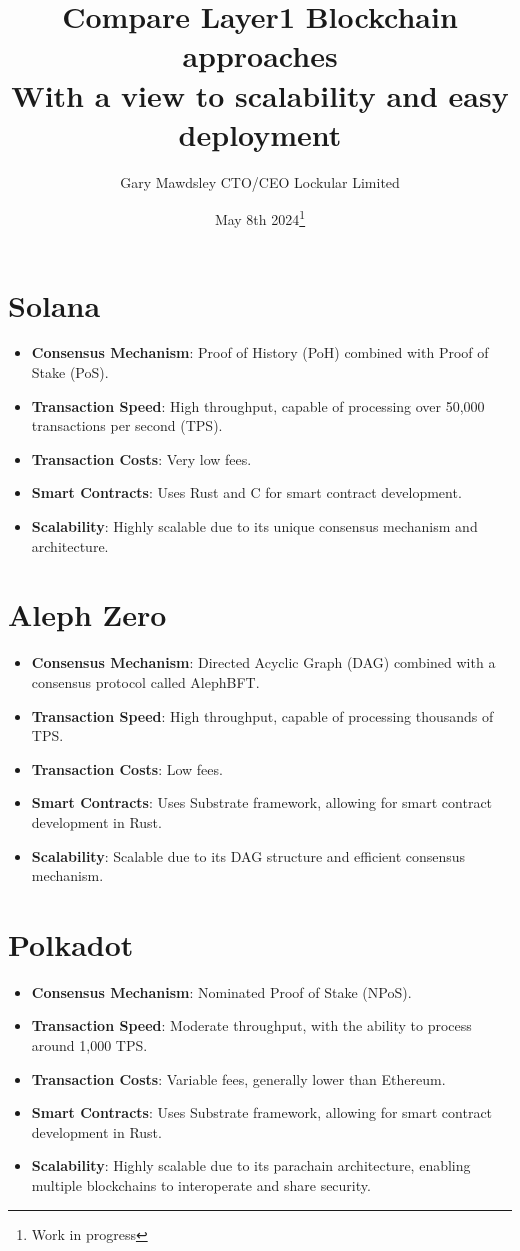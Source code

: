 \documentclass{tufte-handout}
\title{Compare Layer1 Blockchain approaches \\
\large With a view to scalability and easy deployment}
\author[Gary Mawdsley]{Gary Mawdsley CTO/CEO Lockular Limited}
\date{May 8th 2024\thanks{Work in progress}}  %
\begin{document}
\maketitle

\section*{Solana}
\begin{itemize}
    \item \textbf{Consensus Mechanism}: Proof of History (PoH) combined with Proof of Stake (PoS).
    \item \textbf{Transaction Speed}: High throughput, capable of processing over 50,000 transactions per second (TPS).
    \item \textbf{Transaction Costs}: Very low fees.
    \item \textbf{Smart Contracts}: Uses Rust and C for smart contract development.
    \item \textbf{Scalability}: Highly scalable due to its unique consensus mechanism and architecture.
\end{itemize}

\section*{Aleph Zero}
\begin{itemize}
    \item \textbf{Consensus Mechanism}: Directed Acyclic Graph (DAG) combined with a consensus protocol called AlephBFT.
    \item \textbf{Transaction Speed}: High throughput, capable of processing thousands of TPS.
    \item \textbf{Transaction Costs}: Low fees.
    \item \textbf{Smart Contracts}: Uses Substrate framework, allowing for smart contract development in Rust.
    \item \textbf{Scalability}: Scalable due to its DAG structure and efficient consensus mechanism.
\end{itemize}

\section*{Polkadot}
\begin{itemize}
    \item \textbf{Consensus Mechanism}: Nominated Proof of Stake (NPoS).
    \item \textbf{Transaction Speed}: Moderate throughput, with the ability to process around 1,000 TPS.
    \item \textbf{Transaction Costs}: Variable fees, generally lower than Ethereum.
    \item \textbf{Smart Contracts}: Uses Substrate framework, allowing for smart contract development in Rust.
    \item \textbf{Scalability}: Highly scalable due to its parachain architecture, enabling multiple blockchains to interoperate and share security.
\end{itemize}
\end{document}
